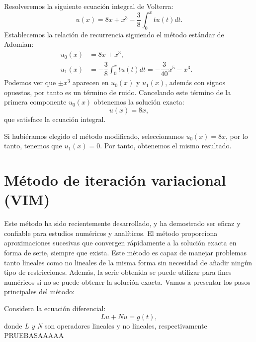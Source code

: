 \begin{ejemplo}
	Resolveremos la siguiente ecuación integral de Volterra:
	\begin{equation}
		u(x) = 8x + x^3 - \dfrac{3}{8} \int_{0}^{x} tu(t)dt.
	\end{equation}
	Establecemos la relación de recurrencia siguiendo el método estándar de Adomian:
	\begin{align}
		u_0(x) &= 8x + x^3,      &   \\
		u_1(x) &= - \dfrac{3}{8} \int_{0}^{x} tu(t)dt = - \dfrac{3}{40}x^5-x^3.    &
	\end{align}
	Podemos ver que $\pm x^3$ aparecen en $u_0(x)$ y $u_1(x)$, además con signos opuestos, por tanto es un término de ruido. Cancelando este término de la primera componente $u_0(x)$ obtenemos la solución exacta:
	\begin{equation}
		u(x) = 8x,
	\end{equation}
	que satisface la ecuación integral.
	\begin{observacion}
		Si hubiéramos elegido el método modificado, seleccionamos $u_0(x) = 8x$, por lo tanto, tenemos que $u_1(x) = 0$. Por tanto, obtenemos el mismo resultado.
	\end{observacion}
\end{ejemplo}

\section{Método de iteración variacional (VIM)}
Este método ha sido recientemente desarrollado, y ha demostrado ser eficaz y confiable para estudios numéricos y analíticos. El método proporciona aproximaciones sucesivas que convergen rápidamente a la solución exacta en forma de serie, siempre que exista. Este método es capaz de manejar problemas tanto lineales como no lineales de la misma forma sin necesidad de añadir ningún tipo de restricciones. Además, la serie obtenida se puede utilizar para fines numéricos si no se puede obtener la solución exacta. Vamos a presentar los pasos principales del método:

Considera la ecuación diferencial:
\begin{equation}
	Lu + Nu = g(t),
\end{equation}
donde \textit{L y N} son operadores lineales y no lineales, respectivamente PRUEBASAAAAA



\endinput

